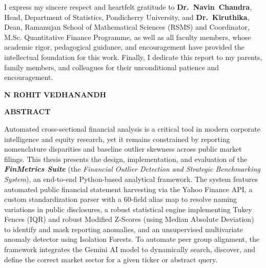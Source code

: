 \documentclass[12pt,oneside]{report}
\begin{document}
\vspace{0.25cm}
\noindent
{\sloppy{}
I express my sincere respect and heartfelt gratitude to \mbox{\textbf{Dr.~Navin Chandra}}, Head, Department of Statistics, Pondicherry University, and \mbox{\textbf{Dr.~Kiruthika}}, Dean, Ramanujan School of Mathematical Sciences (RSMS) and Coordinator, M.Sc. Quantitative Finance Programme, as well as all faculty members, whose academic rigor, pedagogical guidance, and encouragement have provided the intellectual foundation for this work. Finally, I dedicate this report to my parents, family members, and colleagues for their unconditional patience and encouragement.\par}

\vspace{0.4cm}
\begin{flushright}
    \textbf{N ROHIT VEDHANANDH}
\end{flushright}

\newpage
\thispagestyle{plain}
{}
\begin{center}
    \textbf{\LARGE ABSTRACT} \\[1.0cm]
\end{center}

Automated cross-sectional financial analysis is a critical tool in modern corporate intelligence and equity research, yet it remains constrained by reporting nomenclature disparities and baseline outlier skewness across public market filings. This thesis presents the design, implementation, and evaluation of the \textbf{\textit{FinMetrics Suite}} (the \textit{Financial Outlier Detection and Strategic Benchmarking System}), an end-to-end Python-based analytical framework. The system features automated public financial statement harvesting via the Yahoo Finance API, a custom standardization parser with a 60-field alias map to resolve naming variations in public disclosures, a robust statistical engine implementing Tukey Fences (IQR) and robust Modified Z-Scores (using Median Absolute Deviation) to identify and mask reporting anomalies, and an unsupervised multivariate anomaly detector using Isolation Forests. To automate peer group alignment, the framework integrates the Gemini AI model to dynamically search, discover, and define the correct market sector for a given ticker or abstract query.
\end{document}

